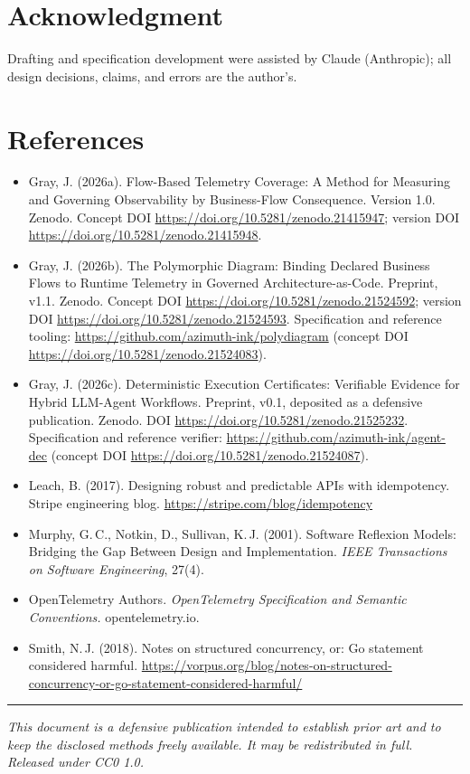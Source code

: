 \documentclass[11pt]{article}
\begin{document}
\section*{Acknowledgment}
Drafting and specification development were assisted by Claude (Anthropic); all design decisions, claims, and errors are the author's.

\section*{References}
\begin{sloppypar}
\begin{itemize}
\item Gray, J. (2026a). Flow-Based Telemetry Coverage: A Method for Measuring and Governing Observability by Business-Flow Consequence. Version 1.0. Zenodo. Concept DOI \url{https://doi.org/10.5281/zenodo.21415947}; version DOI \url{https://doi.org/10.5281/zenodo.21415948}.
\item Gray, J. (2026b). The Polymorphic Diagram: Binding Declared Business Flows to Runtime Telemetry in Governed Architecture-as-Code. Preprint, v1.1. Zenodo. Concept DOI \url{https://doi.org/10.5281/zenodo.21524592}; version DOI \url{https://doi.org/10.5281/zenodo.21524593}. Specification and reference tooling: \url{https://github.com/azimuth-ink/polydiagram} (concept DOI \url{https://doi.org/10.5281/zenodo.21524083}).
\item Gray, J. (2026c). Deterministic Execution Certificates: Verifiable Evidence for Hybrid LLM-Agent Workflows. Preprint, v0.1, deposited as a defensive publication. Zenodo. DOI \url{https://doi.org/10.5281/zenodo.21525232}. Specification and reference verifier: \url{https://github.com/azimuth-ink/agent-dec} (concept DOI \url{https://doi.org/10.5281/zenodo.21524087}).
\item Leach, B. (2017). Designing robust and predictable APIs with idempotency. Stripe engineering blog. \url{https://stripe.com/blog/idempotency}
\item Murphy, G.\,C., Notkin, D., Sullivan, K.\,J. (2001). Software Reflexion Models: Bridging the Gap Between Design and Implementation. \emph{IEEE Transactions on Software Engineering}, 27(4).
\item OpenTelemetry Authors. \emph{OpenTelemetry Specification and Semantic Conventions.} opentelemetry.io.
\item Smith, N.\,J. (2018). Notes on structured concurrency, or: Go statement considered harmful. \url{https://vorpus.org/blog/notes-on-structured-concurrency-or-go-statement-considered-harmful/}
\end{itemize}
\end{sloppypar}

\vspace{1em}
\hrule
\vspace{0.6em}
\noindent\small\emph{This document is a defensive publication intended to establish prior art and to keep the disclosed methods freely available. It may be redistributed in full. Released under CC0 1.0.}
\end{document}
